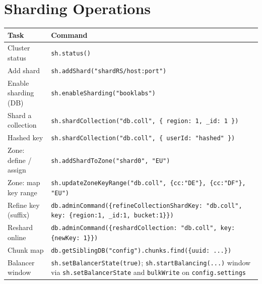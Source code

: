 \section{Sharding Operations}
%
\begin{center}
\footnotesize
\begin{tabular}{@{}p{5.6cm}p{7.2cm}@{}}
\toprule
\textbf{Task} & \textbf{Command} \\
\midrule
Cluster status & \texttt{sh.status()} \\
Add shard & \texttt{sh.addShard("shardRS/host:port")} \\
Enable sharding (DB) & \texttt{sh.enableSharding("booklabs")} \\
Shard a collection & \texttt{sh.shardCollection("db.coll", \{ region: 1, \_id: 1 \})} \\
Hashed key & \texttt{sh.shardCollection("db.coll", \{ userId: "hashed" \})} \\
Zone: define / assign & \texttt{sh.addShardToZone("shard0", "EU")} \\
Zone: map key range & \texttt{sh.updateZoneKeyRange("db.coll", \{cc:"DE"\}, \{cc:"DF"\}, "EU")} \\
Refine key (suffix) & \texttt{db.adminCommand(\{refineCollectionShardKey: "db.coll", key: \{region:1, \_id:1, bucket:1\}\})} \\
Reshard online & \texttt{db.adminCommand(\{reshardCollection: "db.coll", key: \{newKey: 1\}\})} \\
Chunk map & \texttt{db.getSiblingDB("config").chunks.find(\{uuid: ...\})} \\
Balancer window & \texttt{sh.setBalancerState(true)}; \texttt{sh.startBalancing(...)} window via \texttt{sh.setBalancerState} and \texttt{bulkWrite} on \texttt{config.settings} \\
\bottomrule
\end{tabular}
\end{center}

